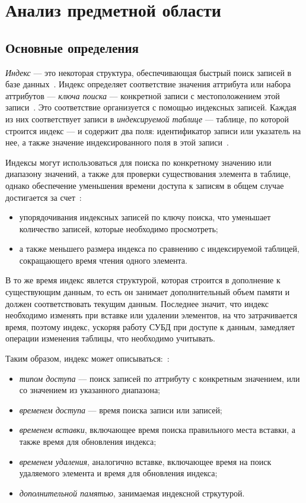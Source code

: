\chapter{Анализ предметной области\label{analysis}}

\section{Основные определения}

\textit{Индекс} --- это некоторая структура, обеспечивающая быстрый поиск
записей в базе данных~\cite{amur}. Индекс определяет соответствие значения
аттрибута или набора аттрибутов --- \textit{ключа поиска} --- конкретной
записи с местоположением этой записи~\cite{ship}. Это соответствие организуется
с помощью индексных записей. Каждая из них соответствует записи в
\textit{индексируемой таблице} --- таблице, по которой строится индекс --- и
содержит два поля: идентификатор записи или указатель на нее, а также значение
индексированного поля в этой записи~\cite{syore}.

Индексы могут использоваться для поиска по конкретному значению или диапазону
значений, а также для проверки существования элемента в таблице, однако
обеспечение уменьшения времени доступа к записям в общем случае достигается за
счет~\cite{ship}:
\begin{itemize}
    \item упорядочивания индексных записей по ключу поиска, что уменьшает
        количество записей, которые необходимо просмотреть;
    \item а также меньшего размера индекса по сравнению с индексируемой
        таблицей, сокращающего время чтения одного элемента.
\end{itemize}

В то же время индекс явлется структурой, которая строится в дополнение к
существующим данным, то есть он занимает дополнительный объем памяти и должен
соответствовать текущим данным.  Последнее значит, что индекс необходимо
изменять при вставке или удалении элементов, на что затрачивается время, поэтому
индекс, ускоряя работу СУБД при доступе к данным, замедляет операции изменения
таблицы, что необходимо учитывать\cite{osip}.

Таким образом, индекс может описываться:~\cite{ship}:
\begin{itemize}
    \item \textit{типом доступа} --- поиск записей по аттрибуту с конкретным
        значением, или со значением из указанного диапазона;
    \item \textit{временем доступа} --- время поиска записи или записей;
    \item \textit{временем вставки}, включающее время поиска правильного места вставки, а
        также время для обновления индекса;
    \item \textit{временем удаления}, аналогично вставке, включающее время на поиск
        удаляемого элемента и время для обновления индекса;
    \item \textit{дополнительной памятью}, занимаемая индексной стркутурой.
\end{itemize}

